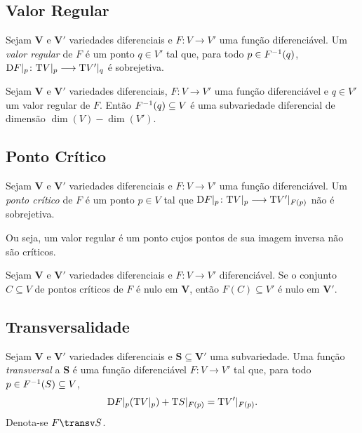 \subsection{Valor Regular}

\begin{defi}
Sejam $\bm V$ e $\bm V'$ variedades diferenciais e $F\colon V \to V'$ uma função diferenciável. Um \emph{valor regular} de $F$ é um ponto $q \in V'$ tal que, para todo $p \in F^{-1}(q)$, $\mathrm{D} F|_p\colon \mathrm{T} V|_p \longrightarrow \mathrm{T} V'|_q$ é  sobrejetiva.
\end{defi}

\begin{prop}
Sejam $\bm V$ e $\bm V'$ variedades diferenciais, $F\colon V \to V'$ uma função diferenciável e $q \in V'$ um valor regular de $F$. Então $F^{-1}(q) \subseteq V$ é uma subvariedade diferencial de dimensão $\dim(V)-\dim(V')$.
\end{prop}

\subsection{Ponto Crítico}

\begin{defi}
Sejam $\bm V$ e $\bm V'$ variedades diferenciais e $F\colon V \to V'$ uma função diferenciável. Um \emph{ponto crítico} de $F$ é um ponto $p \in V$ tal que $\mathrm{D} F|_p\colon \mathrm{T} V|_p \longrightarrow \mathrm{T} V'|_{F(p)}$ não é sobrejetiva.
\end{defi}

Ou seja, um valor regular é um ponto cujos pontos de sua imagem inversa não são críticos.

\begin{prop}
Sejam $\bm V$ e $\bm V'$ variedades diferenciais e $F\colon V \to V'$ diferenciável. Se o conjunto $C \subseteq V$ de pontos críticos de $F$ é nulo em $\bm V$, então $F(C) \subseteq V'$ é nulo em $\bm V'$.
\end{prop}

\subsection{Transversalidade}

\begin{defi}
Sejam $\bm V$ e $\bm V'$ variedades diferenciais e $\bm S \subseteq \bm V'$ uma subvariedade. Uma função \emph{transversal} a $\bm S$ é uma função diferenciável $F\colon V \to V'$ tal que, para todo $p \in F^{-1}(S) \subseteq V$,
	\begin{equation*}
	\mathrm{D} F|_p(\mathrm{T} V|_p) + \mathrm{T} S|_{F(p)} = \mathrm{T} V'|_{F(p)}.
	\end{equation*}
Denota-se $F \transv S$.
\end{defi}

